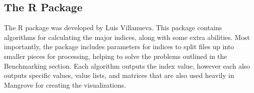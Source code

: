 \subsection{The  R Package}
The  R package was developed by Luis Villanueva. This package contains algorithms for calculating the major indices, along with some extra abilities. Most importantly, the  package includes parameters for indices to split files up into smaller pieces for processing, helping to solve the problems outlined in the Benchmarking section. Each algorithm outputs the index value, however each also outputs specific values, value lists, and matrices that are also used heavily in Mangrove for creating the visualizations.









